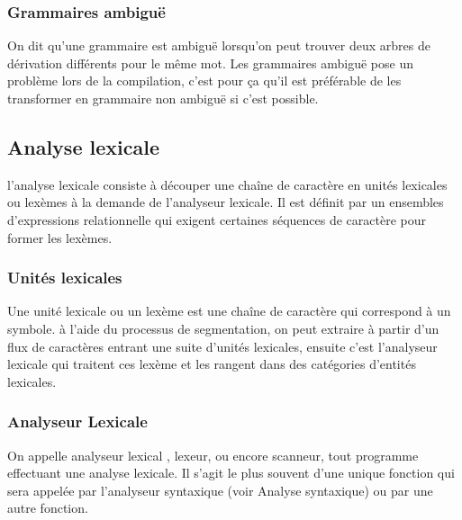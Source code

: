 \documentclass{article}
\begin{document}
\subsubsection{Grammaires ambiguë}
On dit qu’une grammaire est ambiguë  lorsqu’on peut trouver deux arbres de dérivation différents pour le même mot.
Les grammaires ambiguë pose un problème lors de la compilation, c’est pour ça qu’il est préférable de les transformer en grammaire non ambiguë si c’est possible.

\subsection{Analyse lexicale}
l’analyse lexicale consiste à découper une chaîne de caractère en unités lexicales ou lexèmes à la demande de l’analyseur lexicale.
Il est définit par un ensembles d’expressions relationnelle qui exigent certaines séquences de caractère pour former les lexèmes.

\subsubsection{Unités lexicales}
Une unité lexicale ou un lexème est une chaîne de caractère qui correspond à un symbole. à l’aide du processus de segmentation, on peut extraire à partir d’un flux de caractères entrant une suite d’unités lexicales, ensuite c’est l’analyseur lexicale qui traitent ces lexème et les rangent dans des catégories d’entités lexicales.

\subsubsection{Analyseur Lexicale}

On appelle analyseur lexical \cite{refAnalyseurLexicale}, lexeur, ou encore scanneur, tout programme effectuant une analyse lexicale. Il s'agit le plus souvent d'une unique fonction qui sera appelée par l'analyseur syntaxique (voir Analyse syntaxique) ou par une autre fonction.
\end{document}
